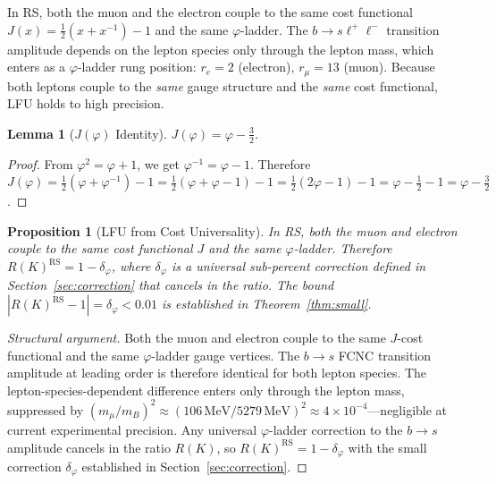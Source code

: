 \documentclass[12pt,a4paper]{article}
\newtheorem{lemma}[theorem]{Lemma}
\newtheorem{proposition}[theorem]{Proposition}
\theoremstyle{definition}
\theoremstyle{remark}
\begin{document}
In RS, both the muon and the electron couple to the same cost functional
$J(x) = \tfrac{1}{2}(x + x^{-1}) - 1$ and the same $\varphi$-ladder.
The $b \to s\ell^+\ell^-$ transition amplitude depends on the lepton
species only through the lepton mass, which enters as a
$\varphi$-ladder rung position: $r_e = 2$ (electron), $r_\mu = 13$
(muon).  Because both leptons couple to the \emph{same} gauge structure
and the \emph{same} cost functional, LFU holds to high precision.

\begin{lemma}[$J(\varphi)$ Identity]
\label{lem:Jphi}
$J(\varphi) = \varphi - \tfrac{3}{2}$.
\end{lemma}

\begin{proof}
From $\varphi^2 = \varphi + 1$, we get $\varphi^{-1} = \varphi - 1$.
Therefore $J(\varphi) = \tfrac{1}{2}(\varphi + \varphi^{-1}) - 1
= \tfrac{1}{2}(\varphi + \varphi - 1) - 1 = \tfrac{1}{2}(2\varphi - 1) - 1
= \varphi - \tfrac{1}{2} - 1 = \varphi - \tfrac{3}{2}$.
\end{proof}

\begin{proposition}[LFU from Cost Universality]
\label{thm:lfu}
In RS, both the muon and electron couple to the same cost functional $J$
and the same $\varphi$-ladder.  Therefore $R(K)^{\mathrm{RS}} = 1 -
\delta_\varphi$, where $\delta_\varphi$ is a universal sub-percent
correction defined in Section~\ref{sec:correction} that cancels in the
ratio.  The bound $|R(K)^{\mathrm{RS}} - 1| = \delta_\varphi < 0.01$
is established in Theorem~\ref{thm:small}.
\end{proposition}

\begin{proof}[Structural argument]
Both the muon and electron couple to the same $J$-cost functional and
the same $\varphi$-ladder gauge vertices.  The $b \to s$ FCNC
transition amplitude at leading order is therefore identical for both
lepton species.  The lepton-species-dependent difference enters only
through the lepton mass, suppressed by
$(m_\mu/m_B)^2 \approx (106\,\mathrm{MeV}/5279\,\mathrm{MeV})^2
\approx 4 \times 10^{-4}$---negligible at current experimental precision.
Any universal $\varphi$-ladder correction to the $b \to s$ amplitude
cancels in the ratio $R(K)$, so $R(K)^{\mathrm{RS}} = 1 -
\delta_\varphi$ with the small correction $\delta_\varphi$
established in Section~\ref{sec:correction}.
\end{proof}

\end{document}
